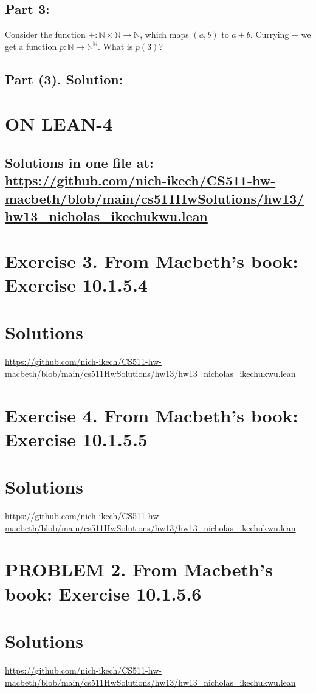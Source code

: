 \documentclass{article}
\begin{document}
 \newpage


 \subsection*{Part 3:  } 
 Consider the function $+ : \mathbb{N} \times \mathbb{N} \to \mathbb{N}$, which maps $(a,b)$ to $a + b$. Currying $+$ we get a function $p : \mathbb{N} \to \mathbb{N}^{\mathbb{N}}$. What is $p(3)$?
  \subsection*{Part (3). Solution:}


 



\newpage



\section*{ON LEAN-4}
\subsection*{Solutions in one file at: 
\url{https://github.com/nich-ikech/CS511-hw-macbeth/blob/main/cs511HwSolutions/hw13/hw13_nicholas_ikechukwu.lean}}
 
\newpage
\section*{Exercise 3. From Macbeth’s book: Exercise 10.1.5.4 }
\section*{Solutions}
\url{https://github.com/nich-ikech/CS511-hw-macbeth/blob/main/cs511HwSolutions/hw13/hw13_nicholas_ikechukwu.lean}



\newpage

\section*{Exercise 4. From Macbeth’s book: Exercise 10.1.5.5 }
\section*{Solutions}
\url{https://github.com/nich-ikech/CS511-hw-macbeth/blob/main/cs511HwSolutions/hw13/hw13_nicholas_ikechukwu.lean}

\newpage


\section*{PROBLEM 2. From Macbeth’s book: Exercise 10.1.5.6}
\section*{Solutions}

\url{https://github.com/nich-ikech/CS511-hw-macbeth/blob/main/cs511HwSolutions/hw13/hw13_nicholas_ikechukwu.lean}
\end{document}

